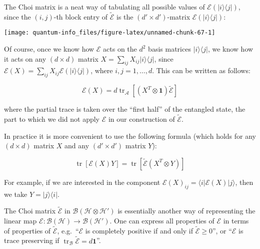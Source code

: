 \documentclass[fleqn]{article}
\newenvironment{idea}{\noindent}{\medskip}
\begin{document}
The Choi matrix is a neat way of tabulating all possible values of \(\mathcal{E}(|i\rangle\langle j|)\), since the \((i,j)\)-th block entry of \(\widetilde{\mathcal{E}}\) is the \((d'\times d')\)-matrix \(\mathcal{E}(|i\rangle\langle j|)\):

\begin{center}\texttt{[image: quantum-info\_files/figure-latex/unnamed-chunk-67-1]} \end{center}

Of course, once we know how \(\mathcal{E}\) acts on the \(d^2\) basis matrices \(|i\rangle\langle j|\), we know how it acts on any \((d\times d)\) matrix \(X=\sum_{ij}X_{ij}|i\rangle\langle j|\), since \(\mathcal{E}(X) = \sum_{ij}X_{ij}\mathcal{E}(|i\rangle\langle j|)\), where \(i,j=1,\ldots, d\).
This can be written as follows:

\begin{idea}

\[
  \mathcal{E}(X) =  d \operatorname{tr}_{\mathcal{A}} [(X^T\otimes\mathbf{1})\widetilde{\mathcal{E}}]
\]

\end{idea}

where the partial trace is taken over the ``first half'' of the entangled state, the part to which we did not apply \(\mathcal{E}\) in our construction of \(\widetilde{\mathcal{E}}\).

In practice it is more convenient to use the following formula (which holds for any \((d\times d)\) matrix \(X\) and any \((d'\times d')\) matrix \(Y\)):

\begin{idea}

\[
 \operatorname{tr}[\mathcal{E}(X)Y]
 = \operatorname{tr}[\widetilde{\mathcal{E}}(X^T\otimes Y)]
\]

\end{idea}

For example, if we are interested in the component \(\mathcal{E}(X)_{ij}= \langle i|\mathcal{E}(X)|j\rangle\), then we take \(Y=|j\rangle\langle i|\).

The Choi matrix \(\widetilde{\mathcal{E}}\) in \(\mathscr{B}(\mathcal{H}\otimes\mathcal{H'})\) is essentially another way of representing the linear map \(\mathcal{E}\colon\mathscr{B}(\mathcal{H})\to\mathscr{B}(\mathcal{H'})\).
One can express all properties of \(\mathcal{E}\) in terms of properties of \(\widetilde{\mathcal{E}}\), e.g.~``\(\mathcal{E}\) is completely positive if and only if \(\widetilde{\mathcal{E}}\geqslant 0\)'', or ``\(\mathcal{E}\) is trace preserving if \(\operatorname{tr}_{\mathcal{B}}\widetilde{\mathcal{E}}=d\mathbf{1}\)''.
\end{document}
